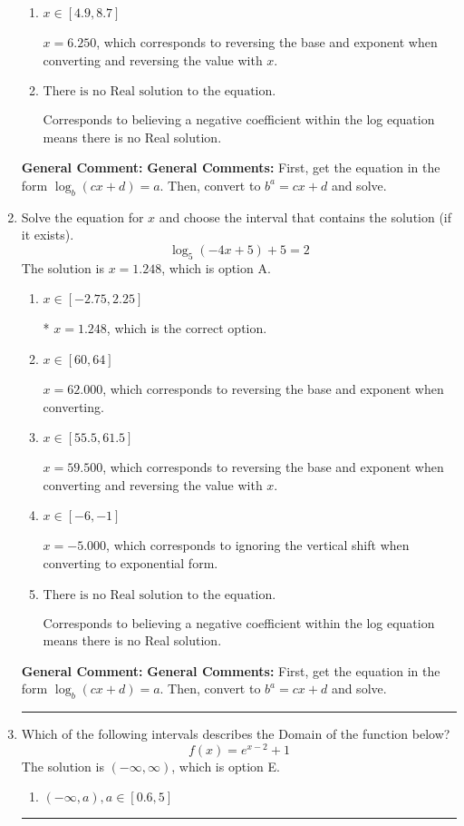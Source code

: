 \documentclass{extbook}[14pt]
\newcommand{\litem}[1]{\item #1

\rule{\textwidth}{0.4pt}}
\begin{document}
\begin{enumerate}
{\begin{enumerate}[label=\Alph*.]
$x = 9.750$, which corresponds to reversing the base and exponent when converting.
\item \( x \in [4.9, 8.7] \)

$x = 6.250$, which corresponds to reversing the base and exponent when converting and reversing the value with $x$.
\item \( \text{There is no Real solution to the equation.} \)

Corresponds to believing a negative coefficient within the log equation means there is no Real solution.
\end{enumerate}

\textbf{General Comment:} \textbf{General Comments:} First, get the equation in the form $\log_b{(cx+d)} = a$. Then, convert to $b^a = cx+d$ and solve.
}
\litem{
Solve the equation for $x$ and choose the interval that contains the solution (if it exists).
\[ \log_{5}{(-4x+5)}+5 = 2 \]
The solution is \( x = 1.248 \), which is option A.\begin{enumerate}[label=\Alph*.]
\item \( x \in [-2.75, 2.25] \)

* $x = 1.248$, which is the correct option.
\item \( x \in [60, 64] \)

$x = 62.000$, which corresponds to reversing the base and exponent when converting.
\item \( x \in [55.5, 61.5] \)

$x = 59.500$, which corresponds to reversing the base and exponent when converting and reversing the value with $x$.
\item \( x \in [-6, -1] \)

$x = -5.000$, which corresponds to ignoring the vertical shift when converting to exponential form.
\item \( \text{There is no Real solution to the equation.} \)

Corresponds to believing a negative coefficient within the log equation means there is no Real solution.
\end{enumerate}

\textbf{General Comment:} \textbf{General Comments:} First, get the equation in the form $\log_b{(cx+d)} = a$. Then, convert to $b^a = cx+d$ and solve.
}
\litem{
Which of the following intervals describes the Domain of the function below?
\[ f(x) = e^{x-2}+1 \]
The solution is \( (-\infty, \infty) \), which is option E.\begin{enumerate}[label=\Alph*.]
\item \( (-\infty, a), a \in [0.6, 5] \)


\end{enumerate}}
\end{enumerate}
\end{document}
